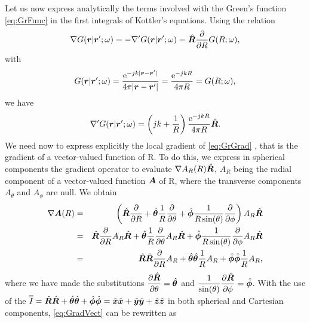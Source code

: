 \par Let us now express analytically the terms involved with the Green's function \eqref{eq:GrFunc} in the first integrals of Kottler's equations. Using the relation
\begin{eqnarray}
\label{eq:GradGreen}
\nabla G(\mbfit{r}|\mbfit{r'};\omega) = -{\nabla}' G(\mbfit{r}|\mbfit{r'};\omega) = \hat{\mbfit{R}} \frac{\partial}{\partial R} G(R;\omega),
\end{eqnarray} with $$G(\mbfit{r}|\mbfit{r'};\omega) = \frac{\mrm{e}^{-jk|\mbfit{r}-\mbfit{r'}|}}{4\pi|\mbfit{r}-\mbfit{r'}|} = \frac{\mrm{e}^{-jkR}}{4\pi R} = G(R;\omega),$$ we have
\begin{eqnarray}
\label{eq:GrGrad}
{\nabla}' G(\mbfit{r}|\mbfit{r'};\omega) = \left ( jk + \frac{1}{R} \right )  \frac{\mrm{e}^{-jkR}}{4\pi R} \hat{\mbfit{R}}.
\end{eqnarray} We need now to express explicitly the local gradient of \eqref{eq:GrGrad} \cite{VBladelSEFS}, that is the gradient of a vector-valued function of R. To do this, we express in spherical components the gradient operator to evaluate $\nabla A_R(R) \hat{\mbfit{R}}$, $A_R$ being the radial component of a vector-valued function $\mbfit{A}$ of R, where the transverse components $A_\theta$ and $A_\phi$ are null. We obtain
\begin{eqnarray}
\label{eq:GradVect}
\nabla \mbfit{A}(R) &= & \left ( \hat{\mbfit{R}} \frac{\partial}{\partial R} + \hat{\mbfit{\theta}} \frac{1}{R} \frac{\partial}{\partial \theta} + \hat{\mbfit{\phi}} \frac{1}{R \sin(\theta)} \frac{\partial}{\partial \phi  }\right )  A_R \hat{\mbfit{R}}  \nonumber \\
&= & \hat{\mbfit{R}} \frac{\partial}{\partial R} {A}_R \hat{\mbfit{R}} + \hat{\mbfit{\theta}} \frac{1}{R} \frac{\partial}{\partial \theta} {A}_R \hat{\mbfit{R}}+ \hat{\mbfit{\phi}} \frac{1}{R \sin(\theta)} \frac{\partial}{\partial \phi} {A}_R \hat{\mbfit{R}} \nonumber \\
&= &\hat{\mbfit{R}}\hat{\mbfit{R}} \frac{\partial}{\partial R} {A}_R  + \hat{\mbfit{\theta}} \hat{\mbfit{\theta}} \frac{1}{R} {A}_R + \hat{\mbfit{\phi}} \hat{\mbfit{\phi}} \frac{1}{R} {A}_R,
\end{eqnarray} where we have made the substitutions $\displaystyle \frac{\partial \hat{\mbfit{R}}}{\partial \theta} = \hat{\mbfit{\theta}}$ and $\displaystyle \frac{1}{\sin(\theta)} \frac{\partial \hat{\mbfit{R}}}{\partial \phi} = \hat{\mbfit{\phi}}$. With the use of the  $\dyad{I} = \hat{\mbfit{R}}\hat{\mbfit{R}}  + \hat{\mbfit{\theta}} \hat{\mbfit{\theta}} + \hat{\mbfit{\phi}} \hat{\mbfit{\phi}} = \hat{\mbfit{x}}\hat{\mbfit{x}}  + \hat{\mbfit{y}} \hat{\mbfit{y}} + \hat{\mbfit{z}} \hat{\mbfit{z}}$ in both spherical and Cartesian components, \eqref{eq:GradVect} can be rewritten as
